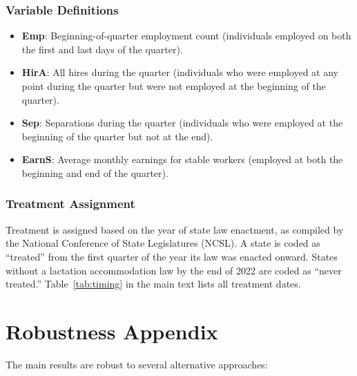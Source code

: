 \documentclass[12pt]{article}
\begin{document}
\subsubsection*{Variable Definitions}
\begin{itemize}
\item \textbf{Emp}: Beginning-of-quarter employment count (individuals employed on both the first and last days of the quarter).
\item \textbf{HirA}: All hires during the quarter (individuals who were employed at any point during the quarter but were not employed at the beginning of the quarter).
\item \textbf{Sep}: Separations during the quarter (individuals who were employed at the beginning of the quarter but not at the end).
\item \textbf{EarnS}: Average monthly earnings for stable workers (employed at both the beginning and end of the quarter).
\end{itemize}

\subsubsection*{Treatment Assignment} Treatment is assigned based on the year of state law enactment, as compiled by the National Conference of State Legislatures (NCSL). A state is coded as ``treated'' from the first quarter of the year its law was enacted onward. States without a lactation accommodation law by the end of 2022 are coded as ``never treated.'' Table~\ref{tab:timing} in the main text lists all treatment dates.




\section{Robustness Appendix}

The main results are robust to several alternative approaches:
\end{document}
